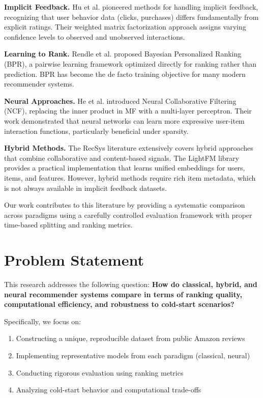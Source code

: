 \textbf{Implicit Feedback.} Hu et al. \cite{hu2008collaborative} pioneered methods for handling implicit feedback, recognizing that user behavior data (clicks, purchases) differs fundamentally from explicit ratings. Their weighted matrix factorization approach assigns varying confidence levels to observed and unobserved interactions.

\textbf{Learning to Rank.} Rendle et al. \cite{rendle2009bpr} proposed Bayesian Personalized Ranking (BPR), a pairwise learning framework optimized directly for ranking rather than prediction. BPR has become the de facto training objective for many modern recommender systems.

\textbf{Neural Approaches.} He et al. \cite{he2017neural} introduced Neural Collaborative Filtering (NCF), replacing the inner product in MF with a multi-layer perceptron. Their work demonstrated that neural networks can learn more expressive user-item interaction functions, particularly beneficial under sparsity.

\textbf{Hybrid Methods.} The RecSys literature extensively covers hybrid approaches that combine collaborative and content-based signals. The LightFM library provides a practical implementation that learns unified embeddings for users, items, and features. However, hybrid methods require rich item metadata, which is not always available in implicit feedback datasets.

Our work contributes to this literature by providing a systematic comparison across paradigms using a carefully controlled evaluation framework with proper time-based splitting and ranking metrics.

\section{Problem Statement}

This research addresses the following question: \textbf{How do classical, hybrid, and neural recommender systems compare in terms of ranking quality, computational efficiency, and robustness to cold-start scenarios?}

Specifically, we focus on:
\begin{enumerate}
    \item Constructing a unique, reproducible dataset from public Amazon reviews
    \item Implementing representative models from each paradigm (classical, neural)
    \item Conducting rigorous evaluation using ranking metrics
    \item Analyzing cold-start behavior and computational trade-offs
\end{enumerate}

